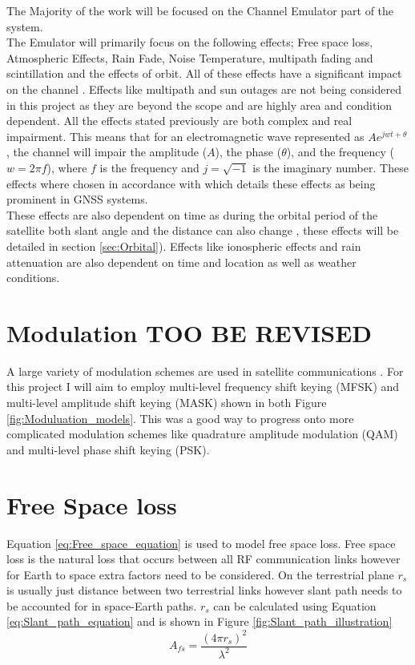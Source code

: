 \documentclass[conference]{IEEEtran}
\begin{document}
The Majority of the work will be focused on the Channel Emulator part of the system.\\

The Emulator will primarily focus on the following effects; Free space loss, Atmospheric Effects, Rain Fade, Noise Temperature, multipath fading and scintillation and the effects of orbit. All of these effects have a significant impact on the channel \cite{kaplan_understanding_2017}. Effects like multipath and sun outages are not being considered in this project as they are beyond the scope and are highly area and condition dependent. All the effects stated previously are both complex and real impairment. This means that for an electromagnetic wave represented as $Ae^{j w t+\theta}$, the channel will impair the amplitude ($A$), the phase ($\theta$), and the frequency ($w = 2\pi f$), where $f$ is the frequency and $j= \sqrt{-1}$ is the imaginary number. These effects where chosen in accordance with \cite{kaplan_understanding_2017} which details these effects as being prominent in GNSS systems.\\

These effects are also dependent on time as during the orbital period of the satellite both slant angle \cite{seybold_introduction_2005} and the distance can also change \cite{10.5555/2601574}, these effects will be detailed in section \ref{sec:Orbital}). Effects like ionospheric effects and rain attenuation are also dependent on time and location as well as weather conditions.
\label{sec:intro}


\section{Modulation TOO BE REVISED}
A large variety of modulation schemes are used in satellite communications \cite{smith_modulation_2017}. For this project I will aim to employ multi-level frequency shift keying (MFSK) and multi-level amplitude shift keying (MASK) shown in both Figure \ref{fig:Moduluation_models}. This was a good way to progress onto more complicated modulation schemes like quadrature amplitude modulation (QAM) and multi-level phase shift keying (PSK).

\label{sec:Modulation}


\section{Free Space loss}
Equation \ref{eq:Free_space_equation} is used to model free space loss. Free space loss is the natural loss that occurs between all RF communication links \cite{seybold_introduction_2005} however for Earth to space extra factors need to be considered. On the terrestrial plane $r_s$ is usually just distance between two terrestrial links however slant path needs to be accounted for in space-Earth paths. $r_s$ can be calculated using Equation \ref{eq:Slant_path_equation} and is shown in Figure \ref{fig:Slant_path_illustration}\\
\begin{equation}
A_{fs} = \frac{(4 \pi r_s)^2}{\lambda^2 }
\label{eq:Free_space_equation}
\end{equation}
\end{document}
